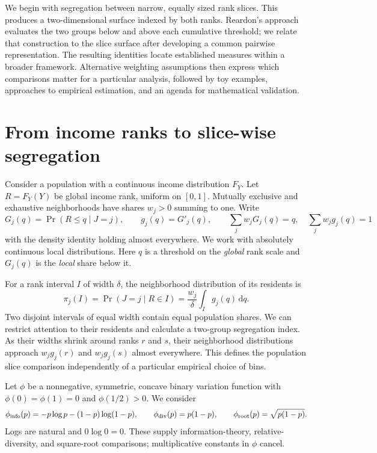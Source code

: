 \documentclass[11pt]{article}
\newcommand{\dd}{\,\mathrm{d}}
\begin{document}
We begin with segregation between narrow, equally sized rank slices. This produces a two-dimensional surface indexed by both ranks. Reardon's approach evaluates the two groups below and above each cumulative threshold; we relate that construction to the slice surface after developing a common pairwise representation. The resulting identities locate established measures within a broader framework. Alternative weighting assumptions then express which comparisons matter for a particular analysis, followed by toy examples, approaches to empirical estimation, and an agenda for mathematical validation.

\section{From income ranks to slice-wise segregation}
\label{sec:slices}

Consider a population with a continuous income distribution $F_Y$. Let $R=F_Y(Y)$ be global income rank, uniform on $[0,1]$. Mutually exclusive and exhaustive neighborhoods have shares $w_j>0$ summing to one. Write
\[
G_j(q)=\Pr(R\leq q\mid J=j),\qquad
g_j(q)=G'_j(q),\qquad
\sum_jw_jG_j(q)=q,\quad \sum_jw_jg_j(q)=1
\]
with the density identity holding almost everywhere. We work with absolutely continuous local distributions. Here $q$ is a threshold on the \emph{global} rank scale and $G_j(q)$ is the \emph{local} share below it.

For a rank interval $I$ of width $\delta$, the neighborhood distribution of its residents is
\[
\pi_j(I)=\Pr(J=j\mid R\in I)
=\frac{w_j}{\delta}\int_I g_j(q)\dd q.
\]
Two disjoint intervals of equal width contain equal population shares. We can restrict attention to their residents and calculate a two-group segregation index. As their widths shrink around ranks $r$ and $s$, their neighborhood distributions approach $w_jg_j(r)$ and $w_jg_j(s)$ almost everywhere. This defines the population slice comparison independently of a particular empirical choice of bins.

Let $\phi$ be a nonnegative, symmetric, concave binary variation function with $\phi(0)=\phi(1)=0$ and $\phi(1/2)>0$. We consider
\[
\phi_{\rm info}(p)=-p\log p-(1-p)\log(1-p),\qquad
\phi_{\rm div}(p)=p(1-p),\qquad
\phi_{\rm root}(p)=\sqrt{p(1-p)}.
\]
Logs are natural and $0\log0=0$. These supply information-theory, relative-diversity, and square-root comparisons; multiplicative constants in $\phi$ cancel.
\end{document}
